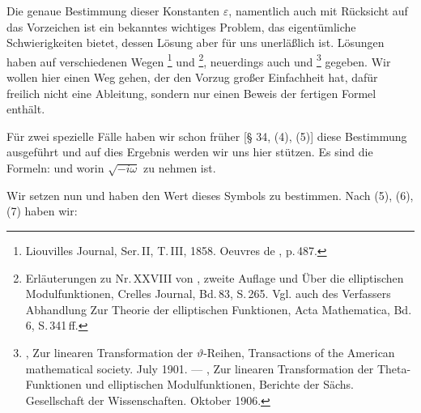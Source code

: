 
Die genaue Bestimmung dieser Konstanten $\varepsilon$, namentlich auch mit Rücksicht auf das Vorzeichen ist ein bekanntes wichtiges Problem, das eigentümliche Schwierigkeiten bietet, dessen Lösung aber für uns unerläßlich ist. Lösungen haben auf verschiedenen Wegen \footnote{Liouvilles Journal, Ser.\,II, T.\,III, 1858. Oeuvres de , p.\,487.} und \footnote{Erläuterungen zu Nr.\,XXVIII von , zweite Auflage und \glqq{}Über die elliptischen Modulfunktionen\grqq{}, Crelles Journal, Bd.\,83, S.\,265. Vgl. auch des Verfassers Abhandlung \glqq{}Zur Theorie der elliptischen Funktionen\grqq{}, Acta Mathematica, Bd.\,6, S.\,341\,ff.}, neuerdings auch  und \footnote{, Zur linearen Transformation der $\vartheta$-Reihen, Transactions of the American mathematical society. July 1901. — , Zur linearen Transformation der Theta-Funktionen und elliptischen Modulfunktionen, Berichte der Sächs. Gesellschaft der Wissenschaften. Oktober 1906.} gegeben. Wir wollen hier einen Weg gehen, der den Vorzug großer Einfachheit hat, dafür freilich nicht eine Ableitung, sondern nur einen Beweis der fertigen Formel enthält.

Für zwei spezielle Fälle haben wir schon früher [§ 34, (4), (5)] diese Bestimmung ausgeführt und auf dies Ergebnis werden wir uns hier stützen. Es sind die Formeln:
und
worin $\sqrt{-i\omega}$  zu nehmen ist.

Wir setzen nun
und haben den Wert dieses Symbols zu bestimmen. Nach (5), (6), (7) haben wir:
